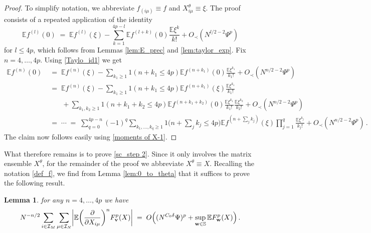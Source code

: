 \documentclass[11pt]{article} %
\numberwithin{equation}{section}
\numberwithin{figure}{section}
\theoremstyle{plain} %
\newtheorem{lemma}[theorem]{Lemma}
\theoremstyle{definition} %
\newcommand{\f}[1]{\boldsymbol{\mathrm{#1}}} %
\newcommand{\bb}{\mathbb} %
\renewcommand{\cal}{\mathcal}
\newcommand{\E}{\mathbb{E}}
\renewcommand{\leq}{\leqslant}
\renewcommand{\geq}{\geqslant}
\newcommand{\ind}[1]{\f 1 (#1)}
\newcommand{\indbb}[1]{\f 1 \pbb{#1}}
\newcommand{\pB}[1]{\Bigl({#1}\Bigr)}
\newcommand{\pbb}[1]{\biggl({#1}\biggr)}
\newcommand{\absbb}[1]{\biggl\lvert #1 \biggr\rvert}
\begin{document}
\begin{proof}
To simplify notation, we abbreviate $f_{(i \mu)} \equiv f$ and $X^\theta_{i \mu} \equiv \xi$. The proof consists of a repeated application of the identity
\begin{equation} \label{Taylo_id1}
\E f^{(l)}(0) \;=\; \E f^{(l)}(\xi) - \sum_{k = 1}^{4p - l} \E f^{(l + k)}(0) \frac{\E \xi^k}{k!} + O_\prec(N^{l/2 - 2} \Psi^p)
\end{equation}
for $l \leq 4p$,
which follows from Lemmas \ref{lem:E_prec} and \ref{lem:taylor_exp}.
Fix $n = 4, \dots, 4p$. Using \eqref{Taylo_id1} we get
\begin{align*}
\E f^{(n)}(0) &\;=\; \E f^{(n)}(\xi) -  \sum_{k_1 \geq 1} \ind{n + k_1 \leq 4p} \E f^{(n + k_1)}(0) \frac{\E \xi^{k_1}}{k_1!} + O_\prec(N^{n/2 - 2} \Psi^p)
\\
&\;=\; \E f^{(n)}(\xi) -  \sum_{k_1 \geq 1} \ind{n + k_1 \leq 4p} \E f^{(n + k_1)}(\xi) \frac{\E \xi^{k_1}}{k_1!}
\\
&\qquad
+ \sum_{k_1,k_2 \geq 1} \ind{n + k_1 + k_2 \leq 4p} \E f^{(n + k_1 + k_2)}(0) \frac{\E \xi^{k_1}}{k_1!} \frac{\E \xi^{k_2}}{k_2!}
 + O_\prec(N^{n/2 - 2} \Psi^p)
 \\
 &\;=\; \cdots \;=\; \sum_{q = 0}^{4p - n} (-1)^q \sum_{k_1, \dots, k_q \geq 1} \indbb{n + \sum_j k_j \leq 4p} \E f^{(n + \sum_j k_j)}(\xi) \prod_{j=1}^q \frac{\E \xi^{k_j}}{k_j!}  + O_\prec(N^{n/2 - 2} \Psi^p)\,.
\end{align*}
The claim now follows easily using \eqref{moments of X-1}.
\end{proof}

What therefore remains is to prove \eqref{sc_step 2}. Since it only involves the matrix ensemble $X^\theta$, for the remainder of the proof we abbreviate $X^\theta \equiv X$. Recalling the notation \eqref{def_f}, we find from Lemma \ref{lem:0_to_theta} that it suffices to prove the following result.

\begin{lemma} \label{lem:sc_step 3}
for any $n = 4, \dots, 4p$ we have
\begin{equation} \label{sc_step 3}
N^{-n/2} \sum_{i \in \cal I_M} \sum_{\mu \in \cal I_N} \absbb{\E \pbb{\frac{\partial}{\partial X_{i \mu}}}^n F^p_{\f v}(X)} \;=\; O \pB{(N^{C_0 \delta}\Psi)^p+\sup_{\f w \in \bb S}\E F^p_{\f w}(X)}\,.
\end{equation}
\end{lemma}
\end{document}
